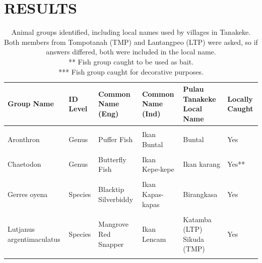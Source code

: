 \documentclass[
]{article}
\begin{document}
\section{RESULTS}\label{results}

\begin{landscape}\begin{table}[H]
\centering\centering
\caption{\label{tab:speciesFound}Animal groups identified, including local names used by villages in Tanakeke. Both members from Tompotanah (TMP) and Lantangpeo (LTP) were asked, so if answers differed, both were included in the local name.
\\** Fish group caught to be used as bait.
      \\*** Fish group caught for decorative purposes.}
\centering
\begin{tabular}[t]{llllll}
\toprule
Group Name & ID Level & Common Name (Eng) & Common Name (Ind) & Pulau Tanakeke Local Name & Locally Caught\\
\midrule
\cellcolor{gray!10}{Acrochordus granulatus} & \cellcolor{gray!10}{Species} & \cellcolor{gray!10}{Marine File Snake} & \cellcolor{gray!10}{} & \cellcolor{gray!10}{Care-care} & \cellcolor{gray!10}{No}\\
Aronthron & Genus & Puffer Fish & Ikan Buntal & Buntal & Yes\\
\cellcolor{gray!10}{Caranx} & \cellcolor{gray!10}{Genus} & \cellcolor{gray!10}{Trevally} & \cellcolor{gray!10}{Ikan Kuwe} & \cellcolor{gray!10}{Juku kebo} & \cellcolor{gray!10}{Yes}\\
Chaetodon & Genus & Butterfly Fish & Ikan Kepe-kepe & Ikan karang & Yes**\\
\cellcolor{gray!10}{Fibramia lateralis} & \cellcolor{gray!10}{Species} & \cellcolor{gray!10}{Humpback Cardinal} & \cellcolor{gray!10}{} & \cellcolor{gray!10}{Besing-besing} & \cellcolor{gray!10}{Yes*}\\
\addlinespace
Gerres oyena & Species & Blacktip Silverbiddy & Ikan Kapas-kapas & Birangkasa & Yes\\
\cellcolor{gray!10}{Hyporhampus} & \cellcolor{gray!10}{Genus} & \cellcolor{gray!10}{Halfbeak} & \cellcolor{gray!10}{Ikan julung-julung} & \cellcolor{gray!10}{Ikan julung-julung} & \cellcolor{gray!10}{No}\\
Lutjanus argentimaculatus & Species & Mangrove Red Snapper & Ikan Lencam & Katamba (LTP)
Sikuda (TMP) & Yes\\
\cellcolor{gray!10}{Lutjanus ehrenbergii} & \cellcolor{gray!10}{Species} & \cellcolor{gray!10}{Blackspot Snapper} & \cellcolor{gray!10}{Kakap Garis} & \cellcolor{gray!10}{Ganrang eja} & \cellcolor{gray!10}{Yes}\\

\end{tabular}
\end{table}
\end{landscape}
\end{document}
